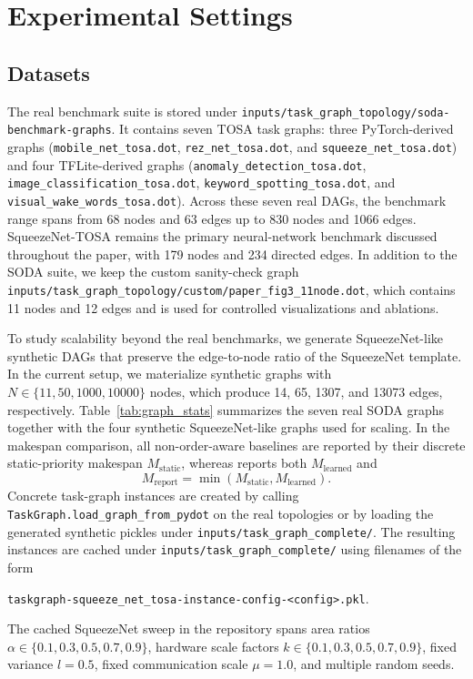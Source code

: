 \section{Experimental Settings}
\label{sec:settings}

\subsection{Datasets}
The real benchmark suite is stored under \texttt{inputs/task\_graph\_topology/soda-benchmark-graphs}. It contains seven TOSA task graphs: three PyTorch-derived graphs (\texttt{mobile\_net\_tosa.dot}, \texttt{rez\_net\_tosa.dot}, and \texttt{squeeze\_net\_tosa.dot}) and four TFLite-derived graphs (\texttt{anomaly\_detection\_tosa.dot}, \texttt{image\_classification\_tosa.dot}, \texttt{keyword\_spotting\_tosa.dot}, and \texttt{visual\_wake\_words\_tosa.dot}). Across these seven real DAGs, the benchmark range spans from 68 nodes and 63 edges up to 830 nodes and 1066 edges. SqueezeNet-TOSA remains the primary neural-network benchmark discussed throughout the paper, with 179 nodes and 234 directed edges. In addition to the SODA suite, we keep the custom sanity-check graph \texttt{inputs/task\_graph\_topology/custom/paper\_fig3\_11node.dot}, which contains 11 nodes and 12 edges and is used for controlled visualizations and ablations.

To study scalability beyond the real benchmarks, we generate SqueezeNet-like synthetic DAGs that preserve the edge-to-node ratio of the SqueezeNet template. In the current setup, we materialize synthetic graphs with $N\in\{11,50,1000,10000\}$ nodes, which produce 14, 65, 1307, and 13073 edges, respectively. Table~\ref{tab:graph_stats} summarizes the seven real SODA graphs together with the four synthetic SqueezeNet-like graphs used for scaling. In the makespan comparison, all non-order-aware baselines are reported by their discrete static-priority makespan $M_{\mathrm{static}}$, whereas \diffgnnorder reports both $M_{\mathrm{learned}}$ and
\begin{equation}
M_{\mathrm{report}}=\min(M_{\mathrm{static}},M_{\mathrm{learned}}).
\end{equation}
Concrete task-graph instances are created by calling \texttt{TaskGraph.load\_graph\_from\_pydot} on the real topologies or by loading the generated synthetic pickles under \texttt{inputs/task\_graph\_complete/}. The resulting instances are cached under \texttt{inputs/task\_graph\_complete/} using filenames of the form
\begin{center}
\texttt{taskgraph-squeeze\_net\_tosa-instance-config-<config>.pkl}.
\end{center}
The cached SqueezeNet sweep in the repository spans area ratios $\alpha \in \{0.1,0.3,0.5,0.7,0.9\}$, hardware scale factors $k \in \{0.1,0.3,0.5,0.7,0.9\}$, fixed variance $l=0.5$, fixed communication scale $\mu=1.0$, and multiple random seeds.

